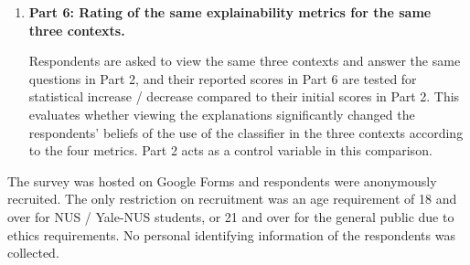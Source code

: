 \begin{enumerate}[listparindent=0.5cm]
	\item \textbf{Part 6: Rating of the same explainability metrics for the same three contexts.} 
	
	Respondents are asked to view the same three contexts and answer the same questions in Part 2, and their reported scores in Part 6 are tested for statistical increase / decrease compared to their initial scores in Part 2. This evaluates whether viewing the explanations significantly changed the respondents' beliefs of the use of the classifier in the three contexts according to the four metrics. Part 2 acts as a control variable in this comparison.
\end{enumerate}

The survey was hosted on Google Forms and respondents were anonymously recruited. The only restriction on recruitment was an age requirement of 18 and over for NUS / Yale-NUS students, or 21 and over for the general public due to ethics requirements. No personal identifying information of the respondents was collected.